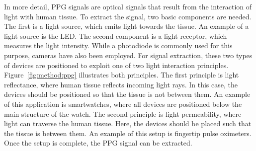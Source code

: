 

In more detail, \gls{PPG} signals are optical signals that result from the interaction of light with human tissue. To extract the signal, two basic components are needed. The first is a light source, which emits light towards the tissue. An example of a light source is the \gls{LED}. The second component is a light receptor, which measures the light intensity. While a photodiode is commonly used for this purpose, cameras have also been employed. For signal extraction, these two types of devices are positioned to exploit one of two light interaction principles. Figure~\ref{fig:method:ppg} illustrates both principles. The first principle is light reflectance, where human tissue reflects incoming light rays. In this case, the devices should be positioned so that the tissue is not between them. An example of this application is smartwatches, where all devices are positioned below the main structure of the watch. The second principle is light permeability, where light can traverse the human tissue. Here, the devices should be placed such that the tissue is between them. An example of this setup is fingertip pulse oximeters. Once the setup is complete, the \gls{PPG} signal can be extracted. 

